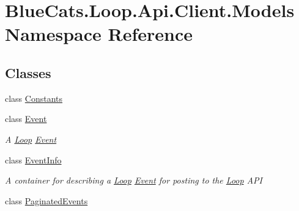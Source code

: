 \hypertarget{namespace_blue_cats_1_1_loop_1_1_api_1_1_client_1_1_models}{}\section{Blue\+Cats.\+Loop.\+Api.\+Client.\+Models Namespace Reference}
\label{namespace_blue_cats_1_1_loop_1_1_api_1_1_client_1_1_models}
\subsection*{Classes}
\begin{DoxyCompactItemize}
\item 
class \mbox{\hyperlink{class_blue_cats_1_1_loop_1_1_api_1_1_client_1_1_models_1_1_constants}{Constants}}
\item 
class \mbox{\hyperlink{class_blue_cats_1_1_loop_1_1_api_1_1_client_1_1_models_1_1_event}{Event}}
\begin{DoxyCompactList}\small\item\em A \mbox{\hyperlink{namespace_blue_cats_1_1_loop}{Loop}} \mbox{\hyperlink{class_blue_cats_1_1_loop_1_1_api_1_1_client_1_1_models_1_1_event}{Event}} \end{DoxyCompactList}\item 
class \mbox{\hyperlink{class_blue_cats_1_1_loop_1_1_api_1_1_client_1_1_models_1_1_event_info}{Event\+Info}}
\begin{DoxyCompactList}\small\item\em A container for describing a \mbox{\hyperlink{namespace_blue_cats_1_1_loop}{Loop}} \mbox{\hyperlink{class_blue_cats_1_1_loop_1_1_api_1_1_client_1_1_models_1_1_event}{Event}} for posting to the \mbox{\hyperlink{namespace_blue_cats_1_1_loop}{Loop}} A\+PI \end{DoxyCompactList}\item 
class \mbox{\hyperlink{class_blue_cats_1_1_loop_1_1_api_1_1_client_1_1_models_1_1_paginated_events}{Paginated\+Events}}
\end{DoxyCompactItemize}
